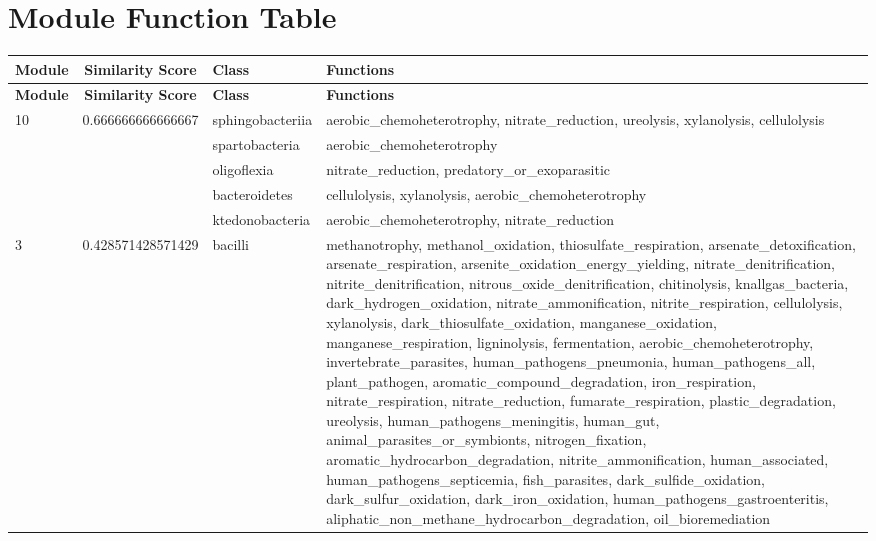 \documentclass{article}
\begin{document}
\section*{Module Function Table}

\footnotesize\renewcommand{\arraystretch}{1.2}\begin{longtable}{|l|c|l|>{\raggedright\arraybackslash}p{6cm}|}
\hline
\textbf{Module} & \textbf{Similarity Score} & \textbf{Class} & \textbf{Functions} \\
\hline
\endfirsthead

\hline
\textbf{Module} & \textbf{Similarity Score} & \textbf{Class} & \textbf{Functions} \\
\hline
\endhead

10 & 0.666666666666667 & sphingobacteriia & aerobic\_chemoheterotrophy, nitrate\_reduction, ureolysis, xylanolysis, cellulolysis\\
\cline{3-4}
 &  & spartobacteria & aerobic\_chemoheterotrophy\\
\cline{3-4}
 &  & oligoflexia & nitrate\_reduction, predatory\_or\_exoparasitic\\
\cline{3-4}
 &  & bacteroidetes & cellulolysis, xylanolysis, aerobic\_chemoheterotrophy\\
\cline{3-4}
 &  & ktedonobacteria & aerobic\_chemoheterotrophy, nitrate\_reduction\\
\hline
3 & 0.428571428571429 & bacilli & methanotrophy, methanol\_oxidation, thiosulfate\_respiration, arsenate\_detoxification, arsenate\_respiration, arsenite\_oxidation\_energy\_yielding, nitrate\_denitrification, nitrite\_denitrification, nitrous\_oxide\_denitrification, chitinolysis, knallgas\_bacteria, dark\_hydrogen\_oxidation, nitrate\_ammonification, nitrite\_respiration, cellulolysis, xylanolysis, dark\_thiosulfate\_oxidation, manganese\_oxidation, manganese\_respiration, ligninolysis, fermentation, aerobic\_chemoheterotrophy, invertebrate\_parasites, human\_pathogens\_pneumonia, human\_pathogens\_all, plant\_pathogen, aromatic\_compound\_degradation, iron\_respiration, nitrate\_respiration, nitrate\_reduction, fumarate\_respiration, plastic\_degradation, ureolysis, human\_pathogens\_meningitis, human\_gut, animal\_parasites\_or\_symbionts, nitrogen\_fixation, aromatic\_hydrocarbon\_degradation, nitrite\_ammonification, human\_associated, human\_pathogens\_septicemia, fish\_parasites, dark\_sulfide\_oxidation, dark\_sulfur\_oxidation, dark\_iron\_oxidation, human\_pathogens\_gastroenteritis, aliphatic\_non\_methane\_hydrocarbon\_degradation, oil\_bioremediation\\

\end{longtable}
\end{document}
